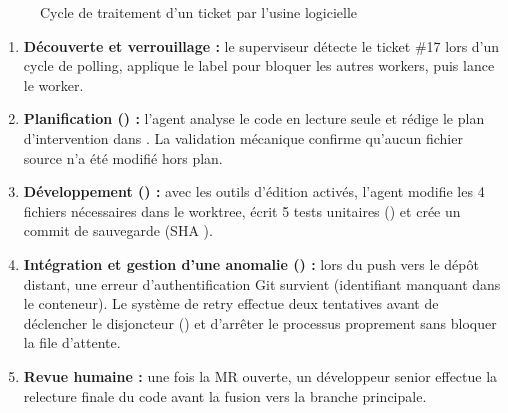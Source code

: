 \documentclass{tnreport}
\begin{document}
\begin{figure}[htbp]
\caption{Cycle de traitement d'un ticket par l'usine logicielle}
\label{fig:cycle_de_vie_ticket_usine}
\end{figure}

\begin{enumerate}
    \item \textbf{Découverte et verrouillage :} le superviseur détecte le ticket \#17 lors d'un cycle de polling, applique le label  pour bloquer les autres workers, puis lance le worker.
    \item \textbf{Planification () :} l'agent analyse le code en lecture seule et rédige le plan d'intervention dans . La validation mécanique confirme qu'aucun fichier source n'a été modifié hors plan.
    \item \textbf{Développement () :} avec les outils d'édition activés, l'agent modifie les 4 fichiers nécessaires dans le worktree, écrit 5 tests unitaires () et crée un commit de sauvegarde (SHA ).
    \item \textbf{Intégration et gestion d'une anomalie () :} lors du push vers le dépôt distant, une erreur d'authentification Git survient (identifiant manquant dans le conteneur). Le système de retry effectue deux tentatives avant de déclencher le disjoncteur () et d'arrêter le processus proprement sans bloquer la file d'attente.
    \item \textbf{Revue humaine :} une fois la MR ouverte, un développeur senior effectue la relecture finale du code avant la fusion vers la branche principale.
\end{enumerate}
\end{document}
